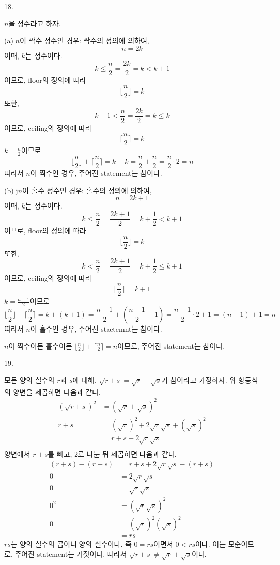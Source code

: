 \documentclass{article}
\begin{document}
18.
\begin{addmargin}[1em]{2em}
$n$을 정수라고 하자.
\newline

(a) $n$이 짝수 정수인 경우: 짝수의 정의에 의하여,
\[n=2k\]
이때, $k$는 정수이다.
\[k \le \frac{n}{2}=\frac{2k}{2}=k < k+1\]
이므로, floor의 정의에 따라
\[\lfloor \frac{n}{2} \rfloor = k\]
또한,
\[k-1 < \frac{n}{2}=\frac{2k}{2}=k \le k\]
이므로, ceiling의 정의에 따라
\[\lceil \frac{n}{2} \rceil = k\]
$k = \frac{n}{2}$이므로
\[\lfloor \frac{n}{2} \rfloor + \lceil \frac{n}{2} \rceil = k + k = \frac{n}{2} + \frac{n}{2} = \frac{n}{2}\cdot 2 = n\]
따라서 $n$이 짝수인 경우, 주어진 statement는 참이다.
\newline

(b) j$n$이 홀수 정수인 경우: 홀수의 정의에 의하여,
\[n=2k + 1\]
이때, $k$는 정수이다.
\[k \le \frac{n}{2}=\frac{2k+1}{2}= k + \frac{1}{2}< k+1\]
이므로, floor의 정의에 따라
\[\lfloor \frac{n}{2} \rfloor = k\]
또한,
\[k < \frac{n}{2}=\frac{2k+1}{2}= k + \frac{1}{2} \le k+1\]
이므로, ceiling의 정의에 따라
\[\lceil \frac{n}{2} \rceil = k+1\]
$k = \frac{n-1}{2}$이므로
\[\lfloor \frac{n}{2} \rfloor + \lceil \frac{n}{2} \rceil = k + (k + 1) = \frac{n-1}{2} + (\frac{n-1}{2} + 1) = \frac{n-1}{2}\cdot 2 + 1 = (n - 1) + 1 = n\]
따라서 $n$이 홀수인 경우, 주어진 staetemnt는 참이다.
\newline

$n$이 짝수이든 홀수이든 $\lfloor \frac{n}{2} \rfloor + \lceil \frac{n}{2} \rceil = n$이므로, 주어진 statement는 참이다.
\end{addmargin}
\bigskip

19.
\begin{addmargin}[1em]{2em}
모든 양의 실수의 $r$과 $s$에 대해, $\sqrt{r+s}=\sqrt{r} + \sqrt{s}$가 참이라고 가정하자.
위 항등식의 양변을 제곱하면 다음과 같다.
\begin{align*}
    (\sqrt{r + s})^2 &= (\sqrt{r} + \sqrt{s})^2 \\
    r + s &= (\sqrt{r})^2 + 2\sqrt{r}\sqrt{s} + (\sqrt{s})^2 \\
    &= r + s + 2\sqrt{r}\sqrt{s} \\
\end{align*}
양변에서 $r+s$를 빼고, 2로 나눈 뒤 제곱하면 다음과 같다.
\begin{align*}
    (r + s) - (r + s) &= r + s + 2\sqrt{r}\sqrt{s} - (r + s)\\
    0 &= 2\sqrt{r}\sqrt{s} \\
    0 &= \sqrt{r}\sqrt{s} \\
    0^2 &= (\sqrt{r}\sqrt{s})^2 \\
    0 &= (\sqrt{r})^2(\sqrt{s})^2 \\
    &= rs
\end{align*}
$rs$는 양의 실수의 곱이니 양의 실수이다. 즉 $0 = rs$이면서 $0 < rs$이다. 이는 모순이므로, 주어진 statement는 거짓이다. 따라서 $\sqrt{r+s}\ne\sqrt{r} + \sqrt{s}$이다.
\end{addmargin}
\bigskip
\end{document}
